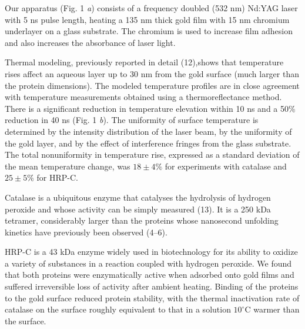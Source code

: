 \documentclass{biophys_letter}
\begin{document}
Our apparatus (Fig. 1 {\it a}) consists of a frequency doubled (532 nm) Nd:YAG laser with 5 ns pulse length, heating a 135 nm thick gold film with 15 nm chromium underlayer on a glass substrate. The chromium is used to increase film adhesion and also increases the absorbance of laser light.

Thermal modeling, previously reported in detail (12),\break shows that temperature rises affect an aqueous layer up to 30 nm from the gold surface (much larger than the protein dimensions). The modeled temperature profiles are in close agreement with temperature measurements obtained using a thermoreflectance method. There is a significant reduction in temperature elevation within 10 ns and a 50\% reduction in 40 ns (Fig. 1 {\it b}). The uniformity of surface temperature is determined by the intensity distribution of the laser beam, by the uniformity of the gold layer, and by the effect of interference fringes from the glass substrate. The total nonuniformity in temperature rise, expressed as a standard deviation of the mean temperature change, was $18 \pm 4\%$ for experiments with catalase and $25 \pm 5\%$ for HRP-C.

Catalase is a ubiquitous enzyme that catalyses the hydrolysis of hydrogen peroxide and whose activity can be simply measured (13). It is a 250 kDa tetramer, considerably larger than the proteins whose nanosecond unfolding kinetics have previously been observed (4--6).

HRP-C is a 43 kDa enzyme widely used in biotechnology for its ability to oxidize a variety of substances in a reaction coupled with hydrogen peroxide. We found that both proteins were enzymatically active when adsorbed onto gold films and suffered irreversible loss of activity after ambient heating. Binding of the proteins to the gold surface reduced protein stability, with the thermal inactivation rate of catalase on the surface roughly equivalent to that in a solution $10^\circ$C warmer than the surface.
\end{document}
